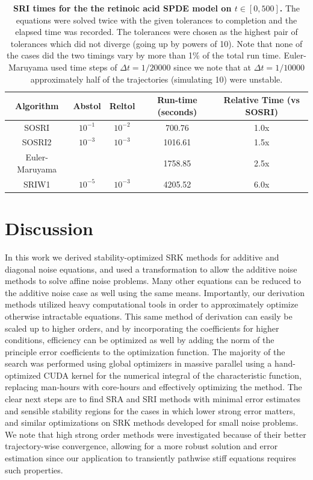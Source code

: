 \documentclass{article}
\begin{document}
\begin{center}
	\begin{table}
		\begin{centering}
			{\footnotesize
			\begin{tabular}{|c|c|c|c|c|}
				\hline
				Algorithm & Abstol & Reltol & Run-time (seconds) & Relative Time (vs SOSRI)\tabularnewline
				\hline
				\hline
				SOSRI & $10^{-1}$ & $10^{-2}$ & 700.76 & 1.0x\tabularnewline
				\hline
				SOSRI2 & $10^{-3}$ & $10^{-3}$ & 1016.61 & 1.5x\tabularnewline
				\hline
				Euler-Maruyama &  &  & 1758.85 & 2.5x\tabularnewline
				\hline
				SRIW1 & $10^{-5}$ & $10^{-3}$ & 4205.52 & 6.0x\tabularnewline
				\hline
			\end{tabular}
			}%
			\par\end{centering}
		\caption{\textbf{SRI times for the the retinoic acid SPDE model on $t\in\left[0,500\right]$.}
			The equations were solved twice with the given tolerances to completion
			and the elapsed time was recorded. The tolerances were chosen as the
			highest pair of tolerances which did not diverge (going up by powers
			of 10). Note that none of the cases did the two timings vary by more
			than 1\% of the total run time. Euler-Maruyama used time steps of
			$\Delta t=1/20000$ since we note that at $\Delta t=1/10000$ approximately
			half of the trajectories (simulating 10) were unstable. \label{tab:SRI-times-for-SPDE}}
	\end{table}
	\par\end{center}

\section{Discussion}

In this work we derived stability-optimized SRK methods for additive
and diagonal noise equations, and used a transformation to allow the
additive noise methods to solve affine noise problems. Many other
equations can be reduced to the additive noise case as well using
the same means. Importantly, our derivation methods utilized heavy
computational tools in order to approximately optimize otherwise intractable
equations. This same method of derivation can easily be scaled up
to higher orders, and by incorporating the coefficients for higher
conditions, efficiency can be optimized as well by adding the norm
of the principle error coefficients to the optimization function.
The majority of the search was performed using global optimizers in
massive parallel using a hand-optimized CUDA kernel for the numerical
integral of the characteristic function, replacing man-hours with
core-hours and effectively optimizing the method. The clear next steps
are to find SRA and SRI methods with minimal error estimates and sensible
stability regions for the cases in which lower strong error matters,
and similar optimizations on SRK methods developed for small noise
problems. We note that high strong order methods were investigated
because of their better trajectory-wise convergence, allowing for
a more robust solution and error estimation since our application
to transiently pathwise stiff equations requires such properties.
\end{document}
